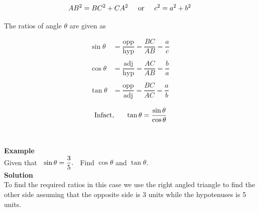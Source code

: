 \documentclass[11pt,a4paper]{article}
\begin{document}
$$AB^2 = BC^2 + CA^2\hspace{0.5cm}\text{or}\hspace{0.5cm} c^2   = a^2 + b^2$$


The ratios of angle $\theta$ are given as

\begin{align*}
\sin \theta & = \dfrac{\text{opp}}{\text{hyp}} = \dfrac{BC}{AB} = \dfrac{a}{c}\\\\
\cos \theta & = \dfrac{\text{adj}}{\text{hyp}}= \dfrac{AC}{AB} = \dfrac{b}{a}\\\\
\tan \theta & = \dfrac{\text{opp}}{\text{adj}} = \dfrac{BC}{AC} = \dfrac{a}{b}
\end{align*}

$$\text{ Infact},\hspace{0.6cm}\tan \theta = \dfrac{\sin \theta}{\cos \theta}$$\\\\






\textbf{Example}\\
Given that $\hspace{0.2cm} \sin \theta = \dfrac{3}{5}.\hspace{0.2cm}$ Find $\cos \theta$ and $\tan \theta$.\\

\textbf{Solution}\\
To find the required ratios in this case we use the right angled triangle to find the other side assuming that the opposite side is 3 units while the hypotenuses is 5 units.




\begin{figure}[H]
\centering
{}
\end{figure}
\end{document}
